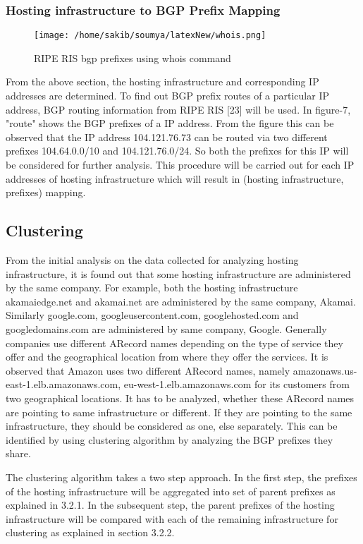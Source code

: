 \subsubsection{Hosting infrastructure to BGP Prefix Mapping}
\begin{figure}[h]
\texttt{[image: /home/sakib/soumya/latexNew/whois.png]}
\centering
\caption{RIPE RIS bgp prefixes using whois command}
\end{figure}
From the above section, the hosting infrastructure and corresponding IP addresses are determined. To find out BGP prefix routes of a particular IP address, BGP routing information from RIPE RIS [23] will be used. In figure-7, "route" shows the BGP prefixes of a IP address. From the figure this can be observed that the IP address 104.121.76.73 can be routed via two different prefixes 104.64.0.0/10 and 104.121.76.0/24. So both the prefixes for this IP will be considered for further analysis. This procedure will be carried out for each IP addresses of hosting infrastructure which will result in (hosting infrastructure, prefixes) mapping.

\subsection{Clustering}
From the initial analysis on the data collected for analyzing hosting infrastructure, it is found out that some hosting infrastructure are administered by the same company. For example, both the hosting infrastructure akamaiedge.net and akamai.net are administered by the same company, Akamai. Similarly google.com, googleusercontent.com, googlehosted.com and googledomains.com are administered by same company, Google. Generally companies use different ARecord names depending on the type of service they offer and the geographical location from where they offer the services. It is observed that Amazon uses two different ARecord names, namely amazonaws.us-east-1.elb.amazonaws.com, eu-west-1.elb.amazonaws.com for its customers from two geographical locations. It has to be analyzed, whether these ARecord names are pointing to same infrastructure or different. If they are pointing to the same infrastructure, they should be considered as one, else separately. This can be identified by using clustering algorithm by analyzing the BGP prefixes they share. 

The clustering algorithm takes a two step approach. In the first step, the prefixes of the hosting infrastructure will be aggregated into set of parent prefixes as explained in 3.2.1. In the subsequent step, the parent prefixes of the hosting infrastructure will be compared with each of the remaining infrastructure for clustering as explained in section 3.2.2.
